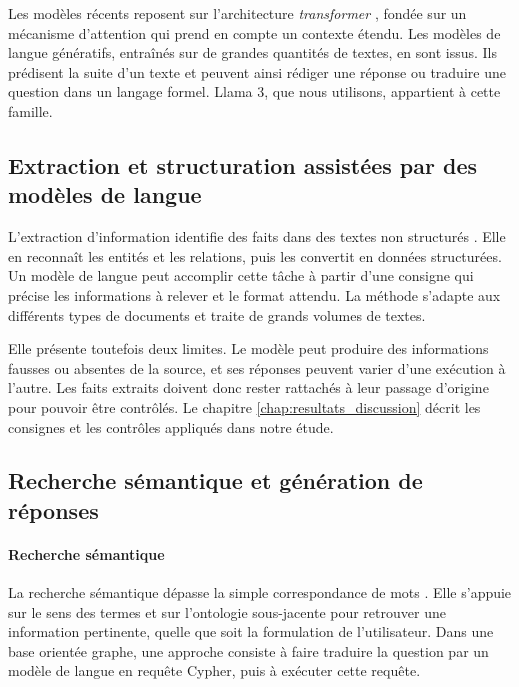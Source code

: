 Les modèles récents reposent sur l'architecture \textit{transformer} \cite{vaswani2017attention}, fondée sur un mécanisme d'attention qui prend en compte un contexte étendu. Les modèles de langue génératifs, entraînés sur de grandes quantités de textes, en sont issus. Ils prédisent la suite d'un texte et peuvent ainsi rédiger une réponse ou traduire une question dans un langage formel. Llama 3, que nous utilisons, appartient à cette famille.

\subsection{Extraction et structuration assistées par des modèles de langue}
\label{subsec:extraction_ia}

L'extraction d'information identifie des faits dans des textes non structurés \cite{grishman2019informationextraction}. Elle en reconnaît les entités et les relations, puis les convertit en données structurées. Un modèle de langue peut accomplir cette tâche à partir d'une consigne qui précise les informations à relever et le format attendu. La méthode s'adapte aux différents types de documents et traite de grands volumes de textes.

Elle présente toutefois deux limites. Le modèle peut produire des informations fausses ou absentes de la source, et ses réponses peuvent varier d'une exécution à l'autre. Les faits extraits doivent donc rester rattachés à leur passage d'origine pour pouvoir être contrôlés. Le chapitre \ref{chap:resultats_discussion} décrit les consignes et les contrôles appliqués dans notre étude.

\subsection{Recherche sémantique et génération de réponses}
\label{subsec:recherche_semantique}

\paragraph{Recherche sémantique}
La recherche sémantique dépasse la simple correspondance de mots \cite{baeza2011information}. Elle s'appuie sur le sens des termes et sur l'ontologie sous-jacente pour retrouver une information pertinente, quelle que soit la formulation de l'utilisateur. Dans une base orientée graphe, une approche consiste à faire traduire la question par un modèle de langue en requête Cypher, puis à exécuter cette requête.

